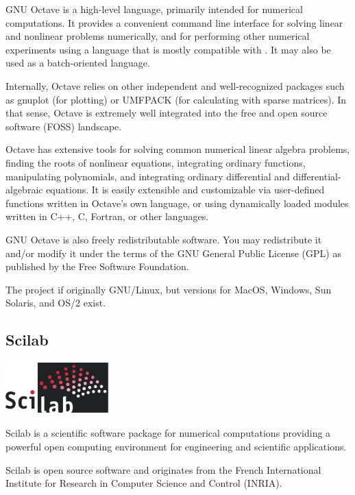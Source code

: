 GNU Octave is a high-level language, primarily intended for numerical computations. It provides a convenient command line interface for solving linear and nonlinear problems numerically, and for performing other numerical experiments using a language that is mostly compatible with {\matlab}. It may also be used as a batch-oriented language.

Internally, Octave relies on other independent and well-recognized packages such as gnuplot (for plotting) or UMFPACK (for calculating with sparse matrices). In that sense, Octave is extremely well integrated into the free and open source software (FOSS) landscape.

Octave has extensive tools for solving common numerical linear algebra problems, finding the roots of nonlinear equations, integrating ordinary functions, manipulating polynomials, and integrating ordinary differential and differential-algebraic equations. It is easily extensible and customizable via user-defined functions written in Octave's own language, or using dynamically loaded modules written in C++, C, Fortran, or other languages.

GNU Octave is also freely redistributable software. You may redistribute it and/or modify it under the terms of the GNU General Public License (GPL) as published by the Free Software Foundation.

The project if originally GNU/Linux, but versions for MacOS, Windows, Sun Solaris, and OS/2 exist.

\subsection{Scilab}

\begin{floatingfigure}[r]{4cm}
\centering
\includegraphics[width=4cm]{figures/scilab_official_logo}
\end{floatingfigure}

Scilab is a scientific software package for numerical computations providing a powerful open computing environment for engineering and scientific applications.

Scilab is open source software and originates from the French International Institute for Research in Computer Science and Control (INRIA).

